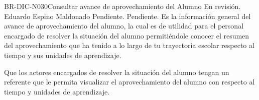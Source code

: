 \begin{BusinessRule}{BR-DIC-N030}{Consultar avance de aprovechamiento del Alumno}
	{\bcCondition} %
	{\btTimer}     %
	{\blControlling}     %
	\BRItem[Estado] En revisión.
	 Eduardo Espino Maldonado
	 Pendiente.
	 Pendiente.
	\BRItem[Descripción] Es la información general del avance de aprovechamiento del alumno, la cual es de utilidad para el personal encargado de resolver la situación del alumno permitiéndole conocer el resumen del aprovechamiento que ha tenido a lo largo de tu trayectoria escolar respecto al tiempo  y sus unidades de aprendizaje.
	\BRItem[Sentencia] \cdtEmpty
	
%		
%		
%		
%	
	\BRItem[Motivación] Que los actores encargados de resolver la situación del alumno tengan un referente que le permita visualizar el aprovechamiento del alumno con respecto al tiempo y unidades de aprendizaje.
\end{BusinessRule}
